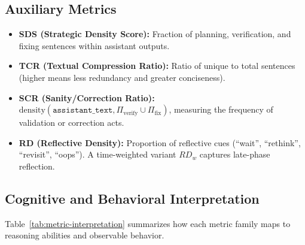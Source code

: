 \documentclass[11pt]{article}
\newcommand{\density}{\mathrm{density}}
\newcommand{\verify}{\Pi_{\text{verify}}}
\newcommand{\fix}{\Pi_{\text{fix}}}
\begin{document}
\subsection{Auxiliary Metrics}
\begin{itemize}
\item \textbf{SDS (Strategic Density Score):} Fraction of planning, verification, and fixing sentences within assistant outputs.
\item \textbf{TCR (Textual Compression Ratio):} Ratio of unique to total sentences (higher means less redundancy and greater conciseness).
\item \textbf{SCR (Sanity/Correction Ratio):} $\density(\texttt{assistant\_text}, \verify \cup \fix)$, measuring the frequency of validation or correction acts.
\item \textbf{RD (Reflective Density):} Proportion of reflective cues (``wait'', ``rethink'', ``revisit'', ``oops''). A time-weighted variant $RD_w$ captures late-phase reflection.
\end{itemize}

\subsection{Cognitive and Behavioral Interpretation}
Table~\ref{tab:metric-interpretation} summarizes how each metric family maps to reasoning abilities and observable behavior.
\end{document}
